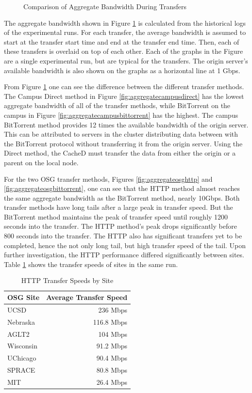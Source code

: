 \begin{figure}[h!t]
\caption{Comparison of Aggregate Bandwidth During Transfers}
\label{fig:aggregatebandwidthcached}
	
\end{figure}

The aggregate bandwidth shown in Figure \ref{fig:aggregatebandwidthcached} is calculated from the historical logs of the experimental runs.  For each transfer, the average bandwidth is assumed to start at the transfer start time and end at the transfer end time.  Then, each of these transfers is overlaid on top of each other.  Each of the graphs in the Figure are a single experimental run, but are typical for the transfers.  The origin server's available bandwidth is also shown on the graphs as a horizontal line at 1 Gbps.

From Figure \ref{fig:aggregatebandwidthcached} one can see the difference between the different transfer methods.  The Campus Direct method in Figure \ref{fig:aggregatecampusdirect} has the lowest aggregate bandwidth of all of the transfer methods, while BitTorrent on the campus in Figure \ref{fig:aggregatecampusbittorrent} has the highest.  The campus BitTorrent method provides 12 times the available bandwidth of the origin server.  This can be attributed to servers in the cluster distributing data between with the BitTorrent protocol without transferring it from the origin server.  Using the Direct method, the CacheD must transfer the data from either the origin or a parent on the local node.

For the two OSG transfer methods, Figures \ref{fig:aggregateosghttp} and \ref{fig:aggregateosgbittorrent}, one can see that the HTTP method almost reaches the same aggregate bandwidth as the BitTorrent method, nearly 10Gbps.  Both transfer methods have long tails after a large peak in transfer speed.  But the BitTorrent method maintains the peak of transfer speed until roughly 1200 seconds into the transfer.  The HTTP method's peak drops significantly before 800 seconds into the transfer.  The HTTP also has significant transfers yet to be completed, hence the not only long tail, but high transfer speed of the tail.  Upon further investigation, the HTTP performance differed significantly between sites.  Table \ref{tbl:transferspeedsites} shows the transfer speeds of sites in the same run.

\begin{table}[h!t]
	\centering
	\bgroup
	\def\arraystretch{1.5}
	\begin{tabular}{l|r}
\textbf{OSG Site} & \textbf{Average Transfer Speed} \\ \hline
UCSD & 236 Mbps \\ \hline
Nebraska & 116.8 Mbps \\ \hline
AGLT2 & 104 Mbps \\ \hline
Wisconsin & 91.2 Mbps \\ \hline
UChicago & 90.4 Mbps \\ \hline
SPRACE & 80.8 Mbps \\ \hline
MIT & 26.4 Mbps \\ \hline
	\end{tabular}
	\egroup
	\caption{HTTP Transfer Speeds by Site}
	\label{tbl:transferspeedsites}
\end{table}

